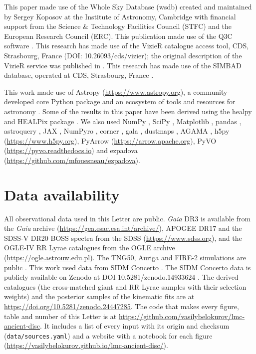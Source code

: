 \documentclass[fleqn,usenatbib,letters]{mnras}
\begin{document}
This paper made use of the Whole Sky Database (wsdb) created and maintained by
Sergey Koposov at the Institute of Astronomy, Cambridge with financial support
from the Science \& Technology Facilities Council (STFC) and the European
Research Council (ERC). This publication made use of the Q3C software
\citep{Koposov2006}. This research has made use of the VizieR catalogue access
tool, CDS, Strasbourg, France (DOI: 10.26093/cds/vizier); the original
description of the VizieR service was published in \citet{Ochsenbein2000}. This
research has made use of the SIMBAD database, operated at CDS, Strasbourg,
France \citep{Wenger2000}.

This work made use of Astropy (\url{https://www.astropy.org}), a
community-developed core Python package and an ecosystem of tools and resources
for astronomy \citep{Astropy2013,Astropy2018,Astropy2022}. Some of the results in
this paper have been derived using the healpy and HEALPix package
\citep{Zonca2019,Gorski2005}. We also used NumPy \citep{Harris2020}, SciPy
\citep{Virtanen2020}, Matplotlib \citep{Hunter2007}, pandas \citep{McKinney2010},
astroquery \citep{Ginsburg2019}, JAX \citep{Bradbury2018}, NumPyro
\citep{Bingham2018,Phan2019}, corner \citep{ForemanMackey2016}, gala
\citep{PriceWhelan2017}, dustmaps \citep{Green2018}, AGAMA \citep{Vasiliev2019},
h5py (\url{https://www.h5py.org}), PyArrow (\url{https://arrow.apache.org}), PyVO
(\url{https://pyvo.readthedocs.io}) and ezpadova
(\url{https://github.com/mfouesneau/ezpadova}).

\section*{Data availability}
All observational data used in this Letter are public. {\it Gaia} DR3 is
available from the {\it Gaia} archive (\url{https://gea.esac.esa.int/archive/}),
APOGEE DR17 and the SDSS-V DR20 BOSS spectra from the SDSS
(\url{https://www.sdss.org}), and the OGLE-IV RR Lyrae catalogues from the OGLE
archive (\url{https://ogle.astrouw.edu.pl}). The TNG50, Auriga and FIRE-2
simulations are public \citep{Nelson2019release,Grand2024,Wetzel2023}. This work used data from SIDM Concerto \citep{Nadler2025}. The SIDM Concerto
data is publicly available on Zenodo at DOI 10.5281/zenodo.14933624
\citep{Nadler2025data}. The derived catalogues (the cross-matched giant
and RR Lyrae samples with their selection weights) and the posterior samples of
the kinematic fits are at \url{https://doi.org/10.5281/zenodo.24447285}. The code that
makes every figure, table and number of this Letter is at
\url{https://github.com/vasilybelokurov/lmc-ancient-disc}. It includes a list
of every input with its origin and checksum (\texttt{data/sources.yaml}) and a
website with a notebook for each figure
(\url{https://vasilybelokurov.github.io/lmc-ancient-disc/}).




\bsp
\label{lastpage}
\end{document}
